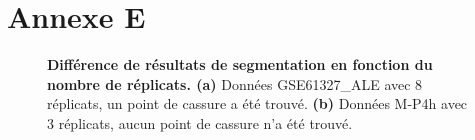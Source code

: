 \documentclass[12pt,a4paper]{report}
\begin{document}
\chapter*{Annexe E}
\label{annexeReplicats}
\begin{figure}[h!]
\centering
{}
\caption{\textbf{Différence de résultats de segmentation en fonction du nombre de réplicats. (a)} Données GSE61327\_ALE avec 8 réplicats, un point de cassure a été trouvé. \textbf{(b)} Données M-P4h avec 3 réplicats, aucun point de cassure n'a été trouvé.} 
\end{figure}
\end{document}
